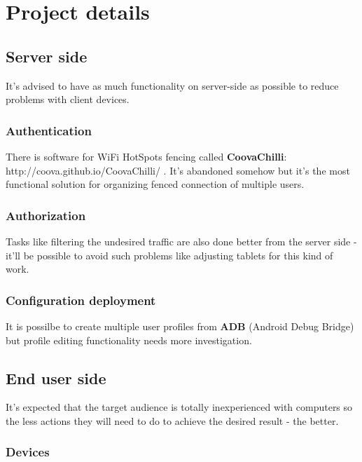 \part{Project details}

\chapter{Server side}

It's advised to have as much functionality on server-side as possible
to reduce problems with client devices.


\section{Authentication}

There is software for WiFi HotSpots fencing called \textbf{CoovaChilli}:
http://coova.github.io/CoovaChilli/ . It's abandoned somehow but it's
the most functional solution for organizing fenced connection of
multiple users.


\section{Authorization}

Tasks like filtering the undesired traffic are also done better from
the server side - it'll be possible to avoid such problems like
adjusting tablets for this kind of work.


\section{Configuration deployment}

It is possilbe to create multiple user profiles from \textbf{ADB}
(Android Debug Bridge) but profile editing functionality needs more
investigation.


\chapter{End user side}

It's expected that the target audience is totally inexperienced with
computers so the less actions they will need to do to achieve the
desired result - the better.


\section{Devices}

